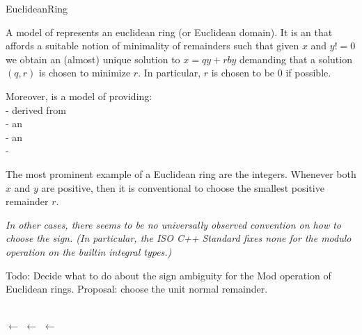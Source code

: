 \begin{ccRefConcept}{EuclideanRing}


\ccDefinition

A model of  represents an euclidean ring (or Euclidean domain). 
It is an  that affords a suitable notion of minimality of remainders 
such that given $x$ and $y != 0$ we obtain an (almost) unique solution to 
$x = qy + r by$ demanding that a solution $(q,r)$ is chosen to minimize $r$. 
In particular, $r$ is chosen to be $0$ if possible.

Moreover,  is a model of 
 providing:\\
 
-  derived from  \\
-  an \\
-  an \\
- \\





The most prominent example of a Euclidean ring are the integers. 
Whenever both $x$ and $y$ are positive, then it is conventional to choose 
the smallest positive remainder $r$. 


{\em \small
In other cases, there seems to be no universally observed convention on how to choose 
the sign. (In particular, the ISO C++ Standard fixes none for the modulo operation 
on the builtin integral types.)

Todo: Decide what to do about the sign ambiguity for the Mod operation of Euclidean rings.
Proposal: choose the unit normal remainder. 
}



\ccRefines
 \\

\ccSeeAlso
        $ \leftarrow $   
        $ \leftarrow $   
        $ \leftarrow $  

\ccHasModels


\end{ccRefConcept}